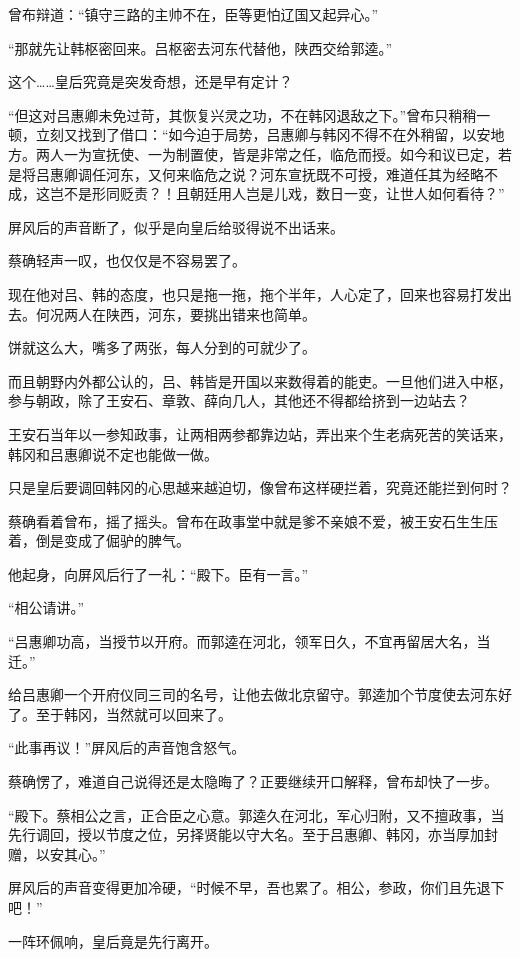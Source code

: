 曾布辩道：“镇守三路的主帅不在，臣等更怕辽国又起异心。”

“那就先让韩枢密回来。吕枢密去河东代替他，陕西交给郭逵。”

这个……皇后究竟是突发奇想，还是早有定计？

“但这对吕惠卿未免过苛，其恢复兴灵之功，不在韩冈退敌之下。”曾布只稍稍一顿，立刻又找到了借口：“如今迫于局势，吕惠卿与韩冈不得不在外稍留，以安地方。两人一为宣抚使、一为制置使，皆是非常之任，临危而授。如今和议已定，若是将吕惠卿调任河东，又何来临危之说？河东宣抚既不可授，难道任其为经略不成，这岂不是形同贬责？！且朝廷用人岂是儿戏，数日一变，让世人如何看待？”

屏风后的声音断了，似乎是向皇后给驳得说不出话来。

蔡确轻声一叹，也仅仅是不容易罢了。

现在他对吕、韩的态度，也只是拖一拖，拖个半年，人心定了，回来也容易打发出去。何况两人在陕西，河东，要挑出错来也简单。

饼就这么大，嘴多了两张，每人分到的可就少了。

而且朝野内外都公认的，吕、韩皆是开国以来数得着的能吏。一旦他们进入中枢，参与朝政，除了王安石、章敦、薛向几人，其他还不得都给挤到一边站去？

王安石当年以一参知政事，让两相两参都靠边站，弄出来个生老病死苦的笑话来，韩冈和吕惠卿说不定也能做一做。

只是皇后要调回韩冈的心思越来越迫切，像曾布这样硬拦着，究竟还能拦到何时？

蔡确看着曾布，摇了摇头。曾布在政事堂中就是爹不亲娘不爱，被王安石生生压着，倒是变成了倔驴的脾气。

他起身，向屏风后行了一礼：“殿下。臣有一言。”

“相公请讲。”

“吕惠卿功高，当授节以开府。而郭逵在河北，领军日久，不宜再留居大名，当迁。”

给吕惠卿一个开府仪同三司的名号，让他去做北京留守。郭逵加个节度使去河东好了。至于韩冈，当然就可以回来了。

“此事再议！”屏风后的声音饱含怒气。

蔡确愣了，难道自己说得还是太隐晦了？正要继续开口解释，曾布却快了一步。

“殿下。蔡相公之言，正合臣之心意。郭逵久在河北，军心归附，又不擅政事，当先行调回，授以节度之位，另择贤能以守大名。至于吕惠卿、韩冈，亦当厚加封赠，以安其心。”

屏风后的声音变得更加冷硬，“时候不早，吾也累了。相公，参政，你们且先退下吧！”

一阵环佩响，皇后竟是先行离开。


